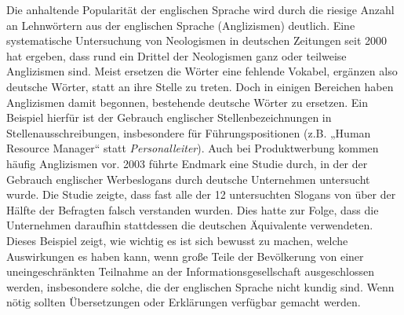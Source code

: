 \documentclass[]{../../metanetpaper}
\begin{document}
\begin{Parallel}[c]{80mm}{80mm}
{Die anhaltende Popularität der englischen Sprache wird durch die riesige Anzahl an Lehnwörtern aus der englischen Sprache (Anglizismen) deutlich. Eine systematische Untersuchung von Neologismen in deutschen Zeitungen seit 2000 hat ergeben, dass rund ein Drittel der Neologismen ganz oder teilweise Anglizismen sind. Meist ersetzen die Wörter eine fehlende Vokabel, ergänzen also deutsche Wörter, statt an ihre Stelle zu treten. Doch in einigen Bereichen haben Anglizismen damit begonnen, bestehende deutsche Wörter zu ersetzen. Ein Beispiel hierfür ist der Gebrauch englischer Stellenbezeichnungen in Stellenausschreibungen, insbesondere für Führungspositionen (z.B. „Human Resource Manager“ statt \textit{Personalleiter}). Auch bei Produktwerbung kommen häufig Anglizismen vor. 2003 führte Endmark eine Studie durch, in der der Gebrauch englischer Werbeslogans durch deutsche Unternehmen untersucht wurde. Die Studie zeigte, dass fast alle der 12 untersuchten Slogans von über der Hälfte der Befragten falsch verstanden wurden. Dies hatte zur Folge, dass die Unternehmen daraufhin stattdessen die deutschen Äquivalente verwendeten. Dieses Beispiel zeigt, wie wichtig es ist sich bewusst zu machen, welche Auswirkungen es haben kann, wenn große Teile der Bevölkerung von einer uneingeschränkten Teilnahme an der Informationsgesellschaft ausgeschlossen werden, insbesondere solche, die der englischen Sprache nicht kundig sind. Wenn nötig sollten Übersetzungen oder Erklärungen verfügbar gemacht werden.
  }
  
\end{Parallel}
\end{document}
